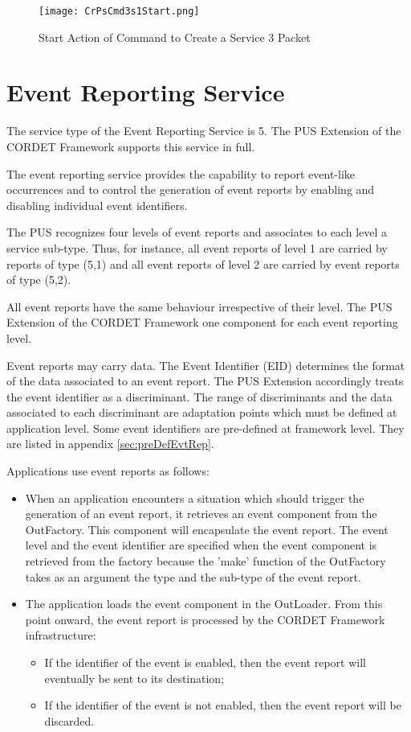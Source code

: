 \documentclass{pnp_article}
\begin{document}
\begin{figure}[H]
 \centering
 \texttt{[image: CrPsCmd3s1Start.png]}
 \caption{Start Action of Command to Create a Service 3 Packet}
 \label{fig:Cmd3s1Start}
\end{figure}


\section{Event Reporting Service}\label{sec:serv5}
The service type of the Event Reporting Service is 5. The PUS Extension of the CORDET Framework supports this service in full.

The event reporting service provides the capability to report event-like occurrences and to control the generation of event reports by enabling and disabling individual event identifiers.

The PUS recognizes four levels of event reports and associates to each level a service sub-type. Thus, for instance, all event reports of level 1 are carried by reports of type (5,1) and all event reports of level 2 are carried by event reports of type (5,2). 

All event reports have the same behaviour irrespective of their level. The PUS Extension of the CORDET Framework one component for each event reporting level.

Event reports may carry data. The Event Identifier (EID) determines the format of the data associated to an event report. The PUS Extension accordingly treats the event identifier as a discriminant. The range of discriminants and the data associated to each discriminant are adaptation points which must be defined at application level. Some event identifiers are pre-defined at framework level. They are listed in appendix \ref{sec:preDefEvtRep}.

Applications use event reports as follows:

\begin{itemize}
\item When an application encounters a situation which should trigger the generation of an event report, it retrieves an event component from the OutFactory. This component will encapsulate the event report. The event level and the event identifier are specified when the event component is retrieved from the factory because the 'make' function of the OutFactory takes as an argument the type and the sub-type of the event report.
\item The application loads the event component in the OutLoader. From this point onward, the event report is processed by the CORDET Framework infrastructure:
	\begin{itemize}
	\item If the identifier of the event is enabled, then the event report will eventually be sent to its destination;
	\item If the identifier of the event is not enabled, then the event report will be discarded.
	\end{itemize}
\end{itemize}
\end{document}
